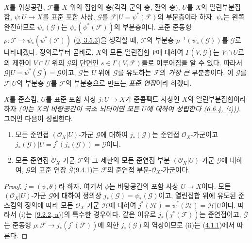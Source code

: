 \begin{env}[9.4.1]
\label{I.9.4.1-ko}
$X$를 위상공간, $\mathscr{F}$를 $X$ 위의 집합의 층(각각 군의 층,
환의 층), $U$를 $X$의 열린부분집합, $\psi:U\to X$를 표준 포함 사상,
$\mathscr{G}$를 $\mathscr{F}|U=\psi^*(\mathscr{F})$의 부분층이라 하자.
$\psi_*$는 왼쪽 완전하므로 $\psi_*(\mathscr{G})$는
$\psi_*(\psi^*(\mathscr{F}))$의 부분층이다. 표준 준동형
$\rho:\mathscr{F}\to\psi_*(\psi^*(\mathscr{F}))$
(\hyperref[0.3.5.3-ko]{0, 3.5.3})을 생각할 때,
$\mathscr{F}$의 부분층
$\rho^{-1}(\psi_*(\mathscr{G}))$를
$\overline{\mathscr{G}}$로 나타내겠다. 정의로부터 곧바로, $X$의 모든
열린집합 $V$에 대하여 $\Gamma(V,\overline{\mathscr{G}})$는
$V\cap U$로의 제한이 $V\cap U$ 위의 $\mathscr{G}$의 단면인
$s\in\Gamma(V,\mathscr{F})$들로 이루어짐을 알 수 있다. 따라서
$\overline{\mathscr{G}}|U=\psi^*(\overline{\mathscr{G}})=\mathscr{G}$이고,
$\overline{\mathscr{G}}$는 $U$ 위에 $\mathscr{G}$를 유도하는
$\mathscr{F}$의 \emph{가장 큰} 부분층이다. 이
$\overline{\mathscr{G}}$를 $\mathscr{F}|U$의 부분층
$\mathscr{G}$를 $\mathscr{F}$의 부분층으로 만드는
\emph{표준 연장}이라 하겠다.
\end{env}

\begin{proposition}[9.4.2]
\label{I.9.4.2-ko}
$X$를 준스킴, $U$를 표준 포함 사상 $j:U\to X$가 준콤팩트 사상인
$X$의 열린부분집합이라 하자
\emph{(이는 $X$의 바탕공간이 \emph{국소 뇌터}이면
\emph{모든} $U$에 대하여 성립한다
(\hyperref[I.6.6.4-ko]{6.6.4, (i)}))}. 그러면 다음이 성립한다.
\begin{enumerate}
\item[(i)] 모든 준연접 $(\mathscr{O}_X|U)$-가군 $\mathscr{G}$에 대하여
  $j_*(\mathscr{G})$는 준연접 $\mathscr{O}_X$-가군이고
  $j_*(\mathscr{G})|U=j^*(j_*(\mathscr{G}))=\mathscr{G}$이다.
\item[(ii)] 모든 준연접 $\mathscr{O}_X$-가군 $\mathscr{F}$와
  그 제한의 모든 준연접 부분-$(\mathscr{O}_X|U)$-가군
  $\mathscr{G}$에 대하여, $\mathscr{G}$의 표준 연장
  $\overline{\mathscr{G}}$(9.4.1)는 $\mathscr{F}$의 준연접
  부분-$\mathscr{O}_X$-가군이다.
\end{enumerate}
\end{proposition}

\begin{proof}
$j=(\psi,\theta)$라 하자. 여기서 $\psi$는 바탕공간의 포함 사상
$U\to X$이다. 모든 $(\mathscr{O}_X|U)$-가군 $\mathscr{G}$에 대하여
정의상 $j_*(\mathscr{G})=\psi_*(\mathscr{G})$이고, 열린집합 위에 유도된
준스킴의 정의에 따라 모든 $\mathscr{O}_X$-가군 $\mathscr{H}$에 대하여
$j^*(\mathscr{H})=\psi^*(\mathscr{H})=\mathscr{H}|U$이다. 따라서 (i)는
(\hyperref[I.9.2.2-ko]{9.2.2, a)})의 특수한 경우이다. 같은 이유로
$j_*(j^*(\mathscr{F}))$는 준연접이고,
$\overline{\mathscr{G}}$는 준동형
$\rho:\mathscr{F}\to j_*(j^*(\mathscr{F}))$에 의한
$j_*(\mathscr{G})$의 역상이므로 (ii)는
(\hyperref[I.4.1.1-ko]{4.1.1})에서 따른다.
\end{proof}

